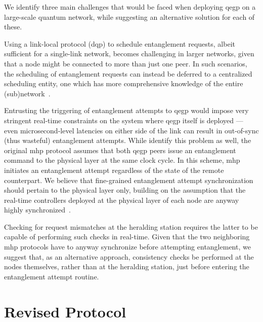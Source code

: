 We identify three main challenges that would be faced when deploying \acrshort{qegp} on a
large-scale quantum network, while suggesting an alternative solution for each of these.
%
\begin{enumerate*}[label=(C\arabic*)]
    \item \label{enum:link_ch_queue} Using a link-local protocol (\acrshort{dqp}) to schedule
          entanglement requests, albeit sufficient for a single-link network, becomes challenging in
          larger networks, given that a node might be connected to more than just one peer. In such
          scenarios, the scheduling of entanglement requests can instead be deferred to a
          centralized scheduling entity, one which has more comprehensive knowledge of the entire
          (sub)network~\cite{skrzypczyk_2021_arch}.
    \item \label{enum:link_ch_tsync} Entrusting the triggering of entanglement attempts to
          \acrshort{qegp} would impose very stringent real-time constraints on the system where
          \acrshort{qegp} itself is deployed --- even microsecond-level latencies on either side of
          the link can result in out-of-sync (thus wasteful) entanglement attempts. While
          \textcite{dahlberg_2019_egp} identify this problem as well, the original \acrshort{mhp}
          protocol assumes that both \acrshort{qegp} peers issue an entanglement command to the
          physical layer at the same clock cycle. In this scheme, \acrshort{mhp} initiates an
          entanglement attempt regardless of the state of the remote counterpart. We believe that
          fine-grained entanglement attempt synchronization should pertain to the physical layer
          only, building on the assumption that the real-time controllers deployed at the physical
          layer of each node are anyway highly synchronized~\cite{pompili_2021_multinode}.
    \item \label{enum:link_ch_mismatch} Checking for request mismatches at the heralding station
          requires the latter to be capable of performing such checks in real-time. Given that the
          two neighboring \acrshort{mhp} protocols have to anyway synchronize before attempting
          entanglement, we suggest that, as an alternative approach, consistency checks be performed
          at the nodes themselves, rather than at the heralding station, just before entering the
          entanglement attempt routine.
\end{enumerate*}

\section{Revised Protocol}

